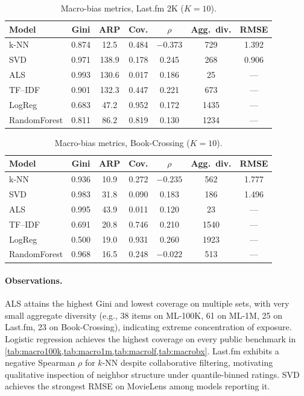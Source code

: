 \documentclass[11pt,a4paper,twoside,openright]{report}
\begin{document}
\begin{table}[htbp]
  \centering
  \caption{Macro-bias metrics, Last.fm 2K ($K=10$).}
  \label{tab:macrolf}
  \begin{tabular}{lcccccc}
    \toprule
    Model & Gini & ARP & Cov. & $\rho$ & Agg.~div. & RMSE \\
    \midrule
    k-NN & 0.874 & 12.5 & 0.484 & $-0.373$ & 729 & 1.392 \\
    SVD & 0.971 & 138.9 & 0.178 & 0.245 & 268 & 0.906 \\
    ALS & 0.993 & 130.6 & 0.017 & 0.186 & 25 & --- \\
    TF--IDF & 0.901 & 132.3 & 0.447 & 0.221 & 673 & --- \\
    LogReg & 0.683 & 47.2 & 0.952 & 0.172 & 1435 & --- \\
    RandomForest & 0.811 & 86.2 & 0.819 & 0.130 & 1234 & --- \\
    \bottomrule
  \end{tabular}
\end{table}

\begin{table}[htbp]
  \centering
  \caption{Macro-bias metrics, Book-Crossing ($K=10$).}
  \label{tab:macrobx}
  \begin{tabular}{lcccccc}
    \toprule
    Model & Gini & ARP & Cov. & $\rho$ & Agg.~div. & RMSE \\
    \midrule
    k-NN & 0.936 & 10.9 & 0.272 & $-0.235$ & 562 & 1.777 \\
    SVD & 0.983 & 31.8 & 0.090 & 0.183 & 186 & 1.496 \\
    ALS & 0.995 & 43.9 & 0.011 & 0.120 & 23 & --- \\
    TF--IDF & 0.691 & 20.8 & 0.746 & 0.210 & 1540 & --- \\
    LogReg & 0.500 & 19.0 & 0.931 & 0.260 & 1923 & --- \\
    RandomForest & 0.968 & 16.5 & 0.248 & $-0.022$ & 513 & --- \\
    \bottomrule
  \end{tabular}
\end{table}

\paragraph{Observations.}
ALS attains the highest Gini and lowest coverage on multiple sets, with very small aggregate diversity (e.g., 38 items on ML-100K, 61 on ML-1M, 25 on Last.fm, 23 on Book-Crossing), indicating extreme concentration of exposure. Logistic regression achieves the highest coverage on every public benchmark in \cref{tab:macro100k,tab:macro1m,tab:macrolf,tab:macrobx}. Last.fm exhibits a negative Spearman $\rho$ for $k$-NN despite collaborative filtering, motivating qualitative inspection of neighbor structure under quantile-binned ratings. SVD achieves the strongest RMSE on MovieLens among models reporting it.
\end{document}
